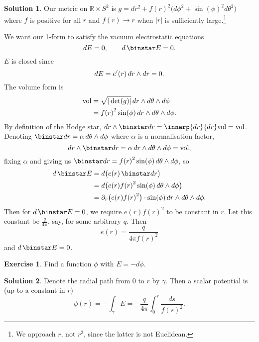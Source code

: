 \documentclass[11pt, a4paper]{report}
\theoremstyle{definition}
\newtheorem{exercise}{Exercise}[part]
\newtheorem{solution}{Solution}[part]
\newenvironment{ex}{\begin{exercise}}{\end{exercise}\pagebreak[1]}
\newenvironment{sol}{\begin{solution}}{\end{solution}\pagebreak[3]}
\newcommand*{\op}[1]{\ensuremath\mathop{}\mathopen{}#1}
\renewcommand*{\d}{\op{d}}
\renewcommand*{\star}{\op{\binstar}\mathord{}}
\begin{document}
\begin{sol}

Our metric on $\mathbb{R} \times S^2$ is $g = dr^2 + {f(r)}^2 \bigl( d\phi^2 + {\sin(\phi)}^2 d\theta^2 \bigr)$ where $f$ is positive for all $r$ and $f(r) \to r$ when $|r|$ is sufficiently large.\footnote{We approach $r$, not $r^2$, since the latter is not Euclidean.}

We want our 1-form to satisfy the vacuum electrostatic equations
\[
    dE = 0, \qquad
    d \star E = 0.
\]
$E$ is closed since
\[
    dE = e'(r) \d r \wedge dr = 0.
\]
The volume form is
\begin{align*}
    \text{vol} &= \sqrt{|\det(g)|} \d r \wedge d\theta \wedge d\phi \\
               &= {f(r)}^2 \sin(\phi) \d r \wedge d\theta \wedge d\phi.
\end{align*}
By definition of the Hodge star, $dr \wedge \star dr = \innerp{dr}{dr} \text{vol} = \text{vol}$.
Denoting $\star dr = \alpha \d \theta \wedge d\phi$ where $\alpha$ is a normalisation factor,
\[
    dr \wedge \star dr = \alpha \d r \wedge d\theta \wedge d\phi = \text{vol},
\]
fixing $\alpha$ and giving us $\star dr = {f(r)}^2 \sin(\phi) \d \theta \wedge d\phi$, so
\begin{align*}
    d \star E &= d \bigl( e(r) \star dr \bigr) \\
              &= d \bigl( e(r) {f(r)}^2 \sin(\phi) \d \theta \wedge d\phi \bigr) \\
              &= \partial_r \bigl( e(r) {f(r)}^2 \bigr) \cdot \sin(\phi) \d r \wedge d\theta \wedge d\phi.
\end{align*}
Then for $d \star E = 0$, we require $e(r) {f(r)}^2$ to be constant in $r$.
Let this constant be $\frac{q}{4 \pi}$, say, for some arbitrary $q$. Then
\[
    e(r) = \frac{q}{4 \pi {f(r)}^2}
\]
and $d \star E = 0$.

\end{sol}

\begin{ex}

Find a function $\phi$ with $E = -d\phi$.

\end{ex}

\begin{sol}

Denote the radial path from $0$ to $r$ by $\gamma$. Then a scalar potential is (up to a constant in $r$)
\[
    \phi(r) = -\int_\gamma E = -\frac{q}{4\pi}\int_0^r \frac{ds}{{f(s)}^2}.
\]

\end{sol}
\end{document}
